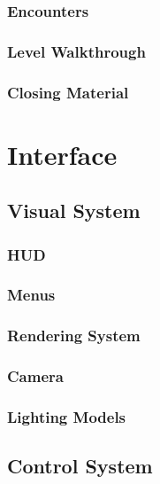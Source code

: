 \documentclass[12pt,titlepage]{article}
\begin{document}
\subsubsection{Encounters}

\subsubsection{Level Walkthrough}

\subsubsection{Closing Material}


\section{Interface}

\subsection{Visual System}

\subsubsection{HUD}

\subsubsection{Menus}

\subsubsection{Rendering System}

\subsubsection{Camera}

\subsubsection{Lighting Models}

\subsection{Control System}
\end{document}
